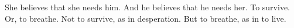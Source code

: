 

﻿She believes that she needs him.  And he believes that he needs her.  To survive.  Or, to breathe.  Not to survive, as in desperation.  But to breathe, as in to live.
\bye
